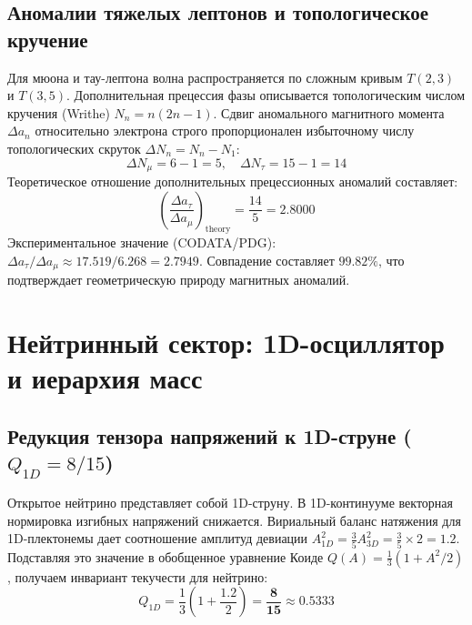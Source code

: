 \documentclass[12pt,a4paper]{article}
\begin{document}
	\subsection{Аномалии тяжелых лептонов и топологическое кручение}
	Для мюона и тау-лептона волна распространяется по сложным кривым $T(2,3)$ и $T(3,5)$. Дополнительная прецессия фазы описывается топологическим числом кручения (Writhe) $N_n = n(2n-1)$.
	Сдвиг аномального магнитного момента $\Delta a_n$ относительно электрона строго пропорционален избыточному числу топологических скруток $\Delta N_n = N_n - N_1$:
	\begin{equation}
		\Delta N_\mu = 6 - 1 = 5, \quad \Delta N_\tau = 15 - 1 = 14
	\end{equation}
	Теоретическое отношение дополнительных прецессионных аномалий составляет:
	\begin{equation}
		\left( \frac{\Delta a_\tau}{\Delta a_\mu} \right)_{\text{theory}} = \frac{14}{5} = \mathbf{2.8000}
	\end{equation}
	Экспериментальное значение (CODATA/PDG): $\Delta a_\tau / \Delta a_\mu \approx 17.519 / 6.268 = \mathbf{2.7949}$. Совпадение составляет $99.82\%$, что подтверждает геометрическую природу магнитных аномалий.
	
	\section{Нейтринный сектор: 1D-осциллятор и иерархия масс}
	
	\subsection{Редукция тензора напряжений к 1D-струне ($Q_{1D} = 8/15$)}
	Открытое нейтрино представляет собой 1D-струну. В 1D-континууме векторная нормировка изгибных напряжений снижается. Вириальный баланс натяжения для 1D-плектонемы дает соотношение амплитуд девиации $A_{1D}^2 = \frac{3}{5} A_{3D}^2 = \frac{3}{5} \times 2 = 1.2$.
	Подставляя это значение в обобщенное уравнение Коиде $Q(A) = \frac{1}{3}(1 + A^2/2)$, получаем инвариант текучести для нейтрино:
	\begin{equation}
		Q_{1D} = \frac{1}{3} \left( 1 + \frac{1.2}{2} \right) = \mathbf{\frac{8}{15}} \approx 0.5333
	\end{equation}
	
\end{document}
